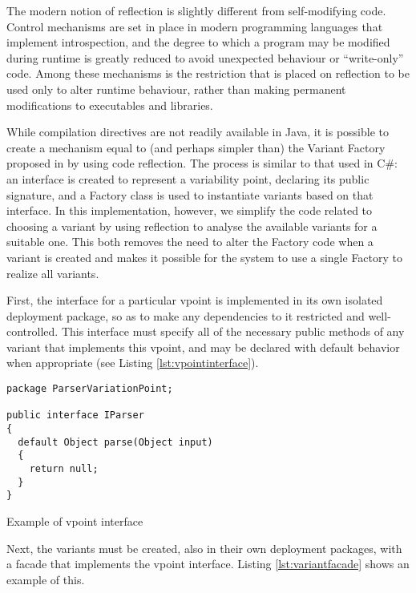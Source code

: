 The modern notion of reflection is slightly different from self-modifying code. Control mechanisms are set in place in modern programming languages that implement introspection, and the degree to which a program may be modified during runtime is greatly reduced to avoid unexpected behaviour or ``write-only'' code. Among these mechanisms is the restriction that is placed on reflection to be used only to alter runtime behaviour, rather than making permanent modifications to executables and libraries.

While compilation directives are not readily available in Java, it is possible to create a mechanism equal to (and perhaps simpler than) the Variant Factory proposed in \cite{LASER:2015} by using code reflection. The process is similar to that used in C\#: an interface is created to represent a variability point, declaring its public signature, and a Factory class is used to instantiate \gls{variant}s based on that interface. In this implementation, however, we simplify the code related to choosing a \gls{variant} by using reflection to analyse the available \gls{variant}s for a suitable one. This both removes the need to alter the Factory code when a \gls{variant} is created and makes it possible for the system to use a single Factory to realize all \gls{variant}s.

First, the interface for a particular \gls{vpoint} is implemented in its own isolated deployment package, so as to make any dependencies to it restricted and well-controlled. This interface must specify all of the necessary public methods of any \gls{variant} that implements this \gls{vpoint}, and may be declared with default behavior when appropriate (see Listing \ref{lst:vpointinterface}).

\begin{listing}
\begin{verbatim}
package ParserVariationPoint;

public interface IParser
{
  default Object parse(Object input)
  {
    return null;
  }
}
\end{verbatim}
\caption{Example of \gls{vpoint} interface} \label{lst:vpointinterface}
\end{listing}

Next, the \gls{variant}s must be created, also in their own deployment packages, with a facade that implements the \gls{vpoint} interface. Listing \ref{lst:variantfacade} shows an example of this.

